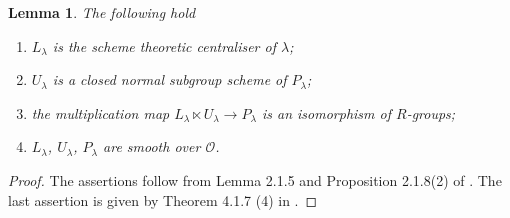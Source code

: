 \documentclass{amsart}
\newtheorem{lem}[prop]{Lemma}
\theoremstyle{definition}
\theoremstyle{remark}
\newcommand{\OO}{\mathcal O}
\begin{document}
\begin{lem}\label{list} The following hold
\begin{enumerate} 
\item $L_{\lambda}$ is the scheme theoretic centraliser of $\lambda$;
\item $U_{\lambda}$ is a closed normal subgroup scheme of $P_{\lambda}$; 
\item the multiplication map $L_{\lambda} \ltimes U_{\lambda} \rightarrow P_{\lambda}$ is an isomorphism of $R$-groups;
\item $L_{\lambda}$, $U_{\lambda}$, $P_{\lambda}$ are smooth over $\OO$.
\end{enumerate} 
\end{lem}
\begin{proof} The assertions follow from Lemma 2.1.5 and Proposition 2.1.8(2) of \cite{CGP}. The last assertion is given by 
Theorem 4.1.7 (4) in \cite{bcnrd}.
\end{proof}
\end{document}
